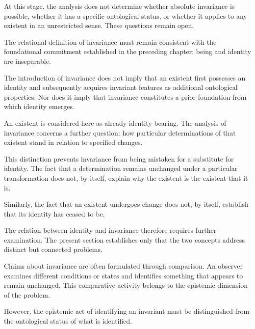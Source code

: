 At this stage, the analysis does not determine whether
absolute invariance is possible, whether it has a
specific ontological status, or whether it applies
to any existent in an unrestricted sense. These
questions remain open.


The relational definition of invariance must remain
consistent with the foundational commitment established
in the preceding chapter: being and identity are
inseparable.

The introduction of invariance does not imply that
an existent first possesses an identity and subsequently
acquires invariant features as additional ontological
properties. Nor does it imply that invariance constitutes
a prior foundation from which identity emerges.

An existent is considered here as already identity-bearing.
The analysis of invariance concerns a further question:
how particular determinations of that existent stand
in relation to specified changes.

This distinction prevents invariance from being
mistaken for a substitute for identity. The fact that
a determination remains unchanged under a particular
transformation does not, by itself, explain why the
existent is the existent that it is.

Similarly, the fact that an existent undergoes change
does not, by itself, establish that its identity has
ceased to be.

The relation between identity and invariance therefore
requires further examination. The present section
establishes only that the two concepts address distinct
but connected problems.


Claims about invariance are often formulated through
comparison. An observer examines different conditions
or states and identifies something that appears to
remain unchanged. This comparative activity belongs
to the epistemic dimension of the problem.

However, the epistemic act of identifying an invariant
must be distinguished from the ontological status of
what is identified.


